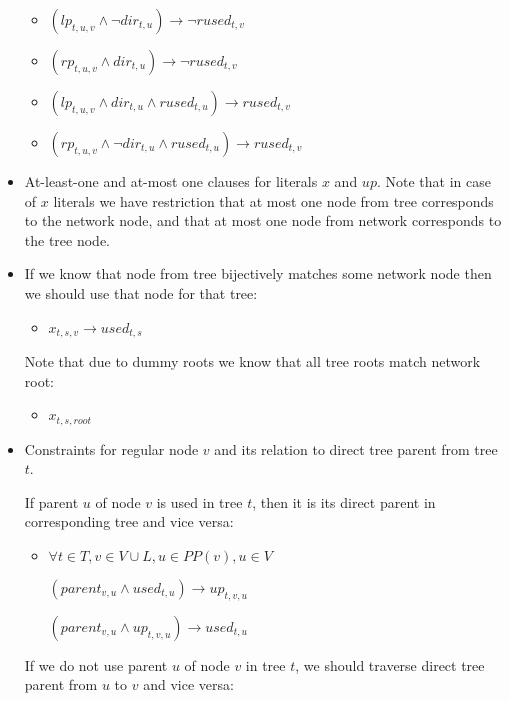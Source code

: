 \documentclass[runningheads, envcountsame, a4paper]{llncs}
\begin{document}
\begin{itemize}
    \begin{itemize}
    \item $(lp_{t,u,v} \wedge \neg dir_{t,u}) \rightarrow \neg rused_{t,v}$
    \item $(rp_{t,u,v} \wedge dir_{t,u}) \rightarrow \neg rused_{t,v}$
    \item $(lp_{t,u,v} \wedge dir_{t,u} \wedge rused_{t,u}) \rightarrow rused_{t,v}$
    \item $(rp_{t,u,v} \wedge \neg dir_{t,u} \wedge rused_{t,u}) \rightarrow rused_{t,v}$
    \end{itemize}
    
\item At-least-one and at-most one clauses for literals $x$ and $up$. Note that in case of $x$ literals we have 
restriction that at most one node from tree corresponds to the network node, and that at most one node from network 
corresponds to the tree node.

\item If we know that node from tree bijectively matches some network node then we should use that node for that tree:
    \begin{itemize}
	\item $x_{t,s,v} \rightarrow used_{t,s}$
    \end{itemize}
    Note that due to dummy roots we know that all tree roots match network root:
    \begin{itemize}
	\item $x_{t,s,root}$
    \end{itemize}

\item Constraints for regular node $v$ and its relation to direct tree parent from tree $t$.

	If parent $u$ of node $v$ is used in tree $t$, then it is its direct parent in corresponding tree and vice versa:

    \begin{itemize}
    \item $\forall t \in T,v \in V \cup L, u \in PP(v), u \in V$
    
    $(parent_{v,u} \wedge used_{t,u}) \rightarrow up_{t,v,u}$
    
    $(parent_{v,u} \wedge up_{t,v,u}) \rightarrow used_{t,u}$
	\end {itemize}
	
	If we do not use parent $u$ of node $v$ in tree $t$, we should traverse direct tree parent from $u$ to $v$ and vice versa:


\end{itemize}
\end{document}
